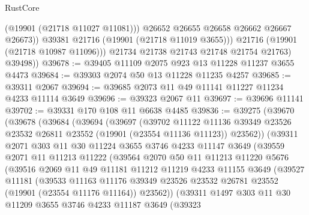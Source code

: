 \begin{lexlean}{RustCore}
\begin{coremodule}
                    (@19901 (@21718 @11027 @11081)))
                  @26652
                  @26655
                  @26658
                  @26662
                  @26667
                  @26673))
              @39381
              @21716
              (@19901 (@21718 @11019 @3655)))
            @21716
            (@19901 (@21718 @10987 @11096)))
          @21734
          @21738
          @21743
          @21748
          @21754
          @21763)
        @39498))
@39678 := @39405 @11109 @2075 @923 @13 @11228 @11237 @3655 @4473
@39684 := @39303 @2074 @50 @13 @11228 @11235 @4257
@39685 := @39311 @2067
@39694 := @39685 @2073 @11 @49 @11141 @11227 @11234 @4233 @11114 @3649
@39696 := @39323 @2067 @11
@39697 := @39696 @11141
@39702 := @39331 @170 @108 @11 @6638 @4485
@39836 := @39275
    (@39670
      (@39678
        (@39684
          (@39694
            (@39697
              (@39702
                @11122
                @11136
                @39349
                @23526
                @23532
                @26811
                @23552
                (@19901 (@23554 @11136 @11123))
                @23562))
            (@39311
              @2071
              @303
              @11
              @30
              @11224
              @3655
              @3746
              @4233
              @11147
              @3649
              (@39559
                @2071
                @11
                @11213
                @11222
                (@39564
                  @2070
                  @50
                  @11
                  @11213
                  @11220
                  @5676
                  (@39516
                    @2069
                    @11
                    @49
                    @11181
                    @11212
                    @11219
                    @4233
                    @11155
                    @3649
                    (@39527
                      @11181
                      (@39533
                        @11163
                        @11176
                        @39349
                        @23526
                        @23532
                        @26781
                        @23552
                        (@19901 (@23554 @11176 @11164))
                        @23562))
                    (@39311
                      @1497
                      @303
                      @11
                      @30
                      @11209
                      @3655
                      @3746
                      @4233
                      @11187
                      @3649
                      (@39323

\end{coremodule}
\end{lexlean}
